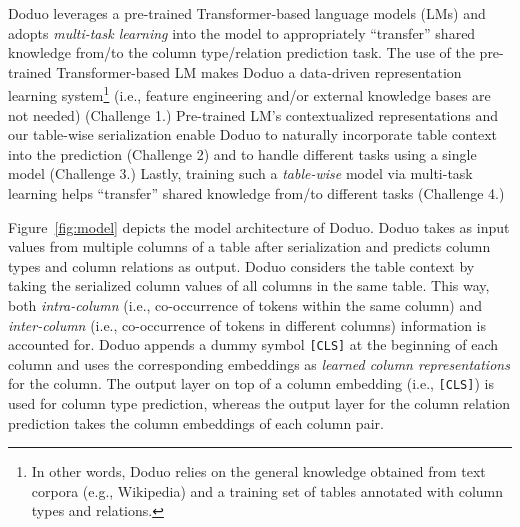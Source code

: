 \documentclass[sigconf]{acmart}
\newcommand{\name}{\mbox{\sc Doduo}}
\newcommand{\rev}[1]{#1}
\begin{document}
\name{} leverages a pre-trained Transformer-based language models (LMs) and adopts {\em multi-task learning} into the model to appropriately ``transfer'' shared knowledge from/to the column type/relation prediction task.
%
The use of the pre-trained Transformer-based LM makes \name{} \rev{a data-driven representation learning system}\footnote{In other words, \name{} relies on the general knowledge obtained from text corpora (e.g., Wikipedia) and a training set of tables annotated with column types and relations.} (i.e., feature engineering and/or external knowledge bases are not needed) (Challenge 1.)
%
Pre-trained LM's contextualized representations and our table-wise serialization enable \name{} to naturally incorporate table context into the prediction (Challenge 2) and to handle different tasks using a single model (Challenge 3.)
%
Lastly, training such a {\em table-wise} model via multi-task learning helps ``transfer'' shared knowledge from/to different tasks (Challenge 4.)

Figure~\ref{fig:model} depicts the model architecture of \name. \name{} takes as input values from multiple columns of a table after serialization and predicts column types and column relations as output.
%
\name{} considers the table context by taking the serialized column values of all columns in the same table.
This way, both {\em intra-column} (i.e., co-occurrence of tokens within the same column) and {\em inter-column} (i.e., co-occurrence of tokens in different columns) information is accounted for.
%
\name{} appends a dummy symbol \texttt{[CLS]} at the beginning of each column and uses the corresponding embeddings as {\em learned column representations} for the column. The output layer on top of a column embedding (i.e., {\tt [CLS]}) is used for column type prediction, whereas the output layer for the column relation prediction takes the column embeddings of each column pair.
%
\end{document}
